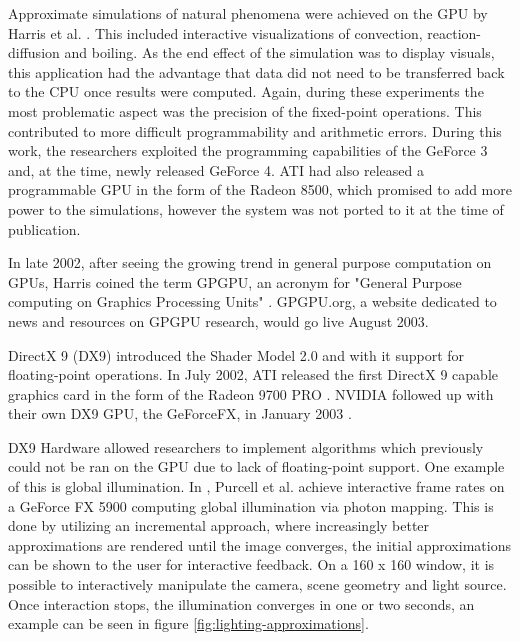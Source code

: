 Approximate simulations of natural phenomena were achieved on the GPU by Harris et al. \cite {physics_simulations_gpgpu}. This included interactive visualizations of convection, reaction-diffusion and boiling. As the end effect of the simulation was to display visuals, this application had the advantage that data did not need to be transferred back to the CPU once results were computed. Again, during these experiments the most problematic aspect was the precision of the fixed-point operations. This contributed to more difficult programmability and arithmetic errors. During this work, the researchers exploited the programming capabilities of the GeForce 3 and, at the time, newly released GeForce 4. ATI had also released a programmable GPU in the form of the Radeon 8500, which promised to add more power to the simulations, however the system was not ported to it at the time of publication.

In late 2002, after seeing the growing trend in general purpose computation on GPUs, Harris coined the term GPGPU, an acronym for "General Purpose computing on Graphics Processing Units" \cite{brief_history_gpgpu}. GPGPU.org, a website dedicated to news and resources on GPGPU research, would go live August 2003.

DirectX 9 (DX9) introduced the Shader Model 2.0 and with it support for floating-point operations. In July 2002, ATI released the first DirectX 9 capable graphics card in the form of the Radeon 9700 PRO \cite{ati_9700_pro}. NVIDIA followed up with their own DX9 GPU, the GeForceFX, in January 2003 \cite{geforcefx}.

DX9 Hardware allowed researchers to implement algorithms which previously could not be ran on the GPU due to lack of floating-point support. One example of this is global illumination. In \cite{photon_mapping_gpgpu}, Purcell et al. achieve interactive frame rates on a GeForce FX 5900 computing global illumination via photon mapping. This is done by utilizing an incremental approach, where increasingly better approximations are rendered until the image converges, the initial approximations can be shown to the user for interactive feedback. On a 160 x 160 window, it is possible to interactively manipulate the camera, scene geometry and light source. Once interaction stops, the illumination converges in one or two seconds, an example can be seen in figure \ref{fig:lighting-approximations}.

